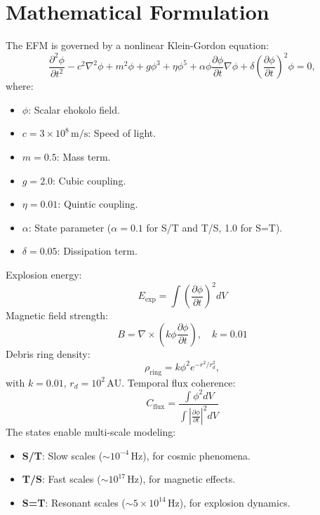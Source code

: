 \documentclass[11pt]{article}
\begin{document}
\section{Mathematical Formulation}
The EFM is governed by a nonlinear Klein-Gordon equation:
\begin{equation}
\frac{\partial^2 \phi}{\partial t^2} - c^2 \nabla^2 \phi + m^2 \phi + g \phi^3 + \eta \phi^5 + \alpha \phi \frac{\partial \phi}{\partial t} \nabla \phi + \delta \left(\frac{\partial \phi}{\partial t}\right)^2 \phi = 0,
\end{equation}
where:
\begin{itemize}
    \item \(\phi\): Scalar ehokolo field.
    \item \(c = 3 \times 10^8 \, \text{m/s}\): Speed of light.
    \item \(m = 0.5\): Mass term.
    \item \(g = 2.0\): Cubic coupling.
    \item \(\eta = 0.01\): Quintic coupling.
    \item \(\alpha\): State parameter (\(\alpha = 0.1\) for S/T and T/S, 1.0 for S=T).
    \item \(\delta = 0.05\): Dissipation term.
\end{itemize}
Explosion energy:
\begin{equation}
E_{\text{exp}} = \int \left( \frac{\partial \phi}{\partial t} \right)^2 dV
\end{equation}
Magnetic field strength:
\begin{equation}
B = \nabla \times \left( k \phi \frac{\partial \phi}{\partial t} \right), \quad k = 0.01
\end{equation}
Debris ring density:
\begin{equation}
\rho_{\text{ring}} = k \phi^2 e^{-r^2 / r_d^2},
\end{equation}
with \(k = 0.01\), \(r_d = 10^2 \, \text{AU}\). Temporal flux coherence:
\begin{equation}
C_{\text{flux}} = \frac{\int \phi^2 dV}{\int \left| \frac{\partial \phi}{\partial t} \right|^2 dV}
\end{equation}
The states enable multi-scale modeling:
\begin{itemize}
    \item \textbf{S/T}: Slow scales (\(\sim 10^{-4} \, \text{Hz}\)), for cosmic phenomena.
    \item \textbf{T/S}: Fast scales (\(\sim 10^{17} \, \text{Hz}\)), for magnetic effects.
    \item \textbf{S=T}: Resonant scales (\(\sim 5 \times 10^{14} \, \text{Hz}\)), for explosion dynamics.
\end{itemize}
\end{document}
